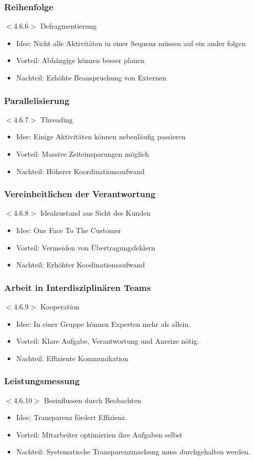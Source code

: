 \documentclass{beamer}
\begin{document}
 \begin{frame}
  \frametitle{Reihenfolge}
  $<$4.6.6$>$
  Defragmentierung
  \begin{itemize}
    \item Idee: Nicht alle Aktivitäten in einer Sequenz müssen auf ein ander folgen
    \item Vorteil: Abhängige können besser planen
    \item Nachteil: Erhöhte Beanspruchung von Externen
  \end{itemize}
 \end{frame}

 \begin{frame}
  \frametitle{Parallelisierung}
  $<$4.6.7$>$
  Threading
  \begin{itemize}
    \item Idee: Einige Aktivitäten können nebenläufig passieren
    \item Vorteil: Massive Zeiteinsparungen möglich
    \item Nachteil: Höherer Koordinationsaufwand
  \end{itemize}
 \end{frame}

 \begin{frame}
  \frametitle{Vereinheitlichen der Verantwortung}
  $<$4.6.8$>$
  Idealzustand aus Sicht des Kunden
  \begin{itemize}
    \item Idee: \glqq One Face To The Customer\grqq
    \item Vorteil: Vermeiden von Übertragungsfehlern
    \item Nachteil: Erhöhter Koodinationsaufwand
  \end{itemize}
 \end{frame}

 \begin{frame}
  \frametitle{Arbeit in Interdisziplinären Teams}
  $<$4.6.9$>$
  Kooperation
  \begin{itemize}
    \item Idee: In einer Gruppe können Experten mehr als allein.
    \item Vorteil: Klare Aufgabe, Verantwortung und Anreize nötig.
    \item Nachteil: Effiziente Kommunikation
  \end{itemize}
 \end{frame}

 \begin{frame}
  \frametitle{Leistungsmessung}
  $<$4.6.10$>$
  Beeinflussen durch Beobachten
  \begin{itemize}
    \item Idee: Transparenz fördert Effizienz.
    \item Vorteil: Mitarbeiter optimierien ihre Aufgaben selbst
    \item Nachteil: Systematische Transparenzmachung muss durchgehalten werden.
  \end{itemize}
 \end{frame}
\end{document}

